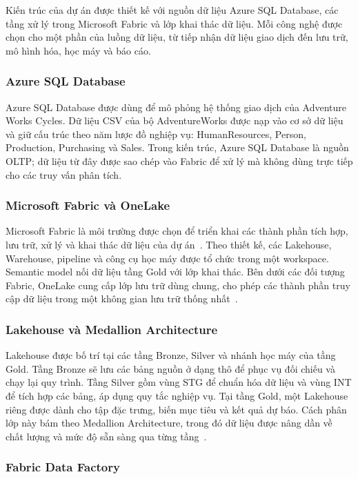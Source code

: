 Kiến trúc của dự án được thiết kế với nguồn dữ liệu Azure SQL Database, các tầng xử lý trong Microsoft Fabric và lớp khai thác dữ liệu. Mỗi công nghệ được chọn cho một phần của luồng dữ liệu, từ tiếp nhận dữ liệu giao dịch đến lưu trữ, mô hình hóa, học máy và báo cáo.

\subsubsection{Azure SQL Database}

Azure SQL Database được dùng để mô phỏng hệ thống giao dịch của Adventure Works Cycles. Dữ liệu CSV của bộ AdventureWorks được nạp vào cơ sở dữ liệu và giữ cấu trúc theo năm lược đồ nghiệp vụ: HumanResources, Person, Production, Purchasing và Sales. Trong kiến trúc, Azure SQL Database là nguồn OLTP; dữ liệu từ đây được sao chép vào Fabric để xử lý mà không dùng trực tiếp cho các truy vấn phân tích.

\subsubsection{Microsoft Fabric và OneLake}

Microsoft Fabric là môi trường được chọn để triển khai các thành phần tích hợp, lưu trữ, xử lý và khai thác dữ liệu của dự án~\citep{microsoft-fabric}. Theo thiết kế, các Lakehouse, Warehouse, pipeline và công cụ học máy được tổ chức trong một workspace. Semantic model nối dữ liệu tầng Gold với lớp khai thác. Bên dưới các đối tượng Fabric, OneLake cung cấp lớp lưu trữ dùng chung, cho phép các thành phần truy cập dữ liệu trong một không gian lưu trữ thống nhất~\citep{microsoft-onelake}.

\subsubsection{Lakehouse và Medallion Architecture}

Lakehouse được bố trí tại các tầng Bronze, Silver và nhánh học máy của tầng Gold. Tầng Bronze sẽ lưu các bảng nguồn ở dạng thô để phục vụ đối chiếu và chạy lại quy trình. Tầng Silver gồm vùng STG để chuẩn hóa dữ liệu và vùng INT để tích hợp các bảng, áp dụng quy tắc nghiệp vụ. Tại tầng Gold, một Lakehouse riêng được dành cho tập đặc trưng, biến mục tiêu và kết quả dự báo. Cách phân lớp này bám theo Medallion Architecture, trong đó dữ liệu được nâng dần về chất lượng và mức độ sẵn sàng qua từng tầng~\citep{microsoft-medallion}.

\subsubsection{Fabric Data Factory}

